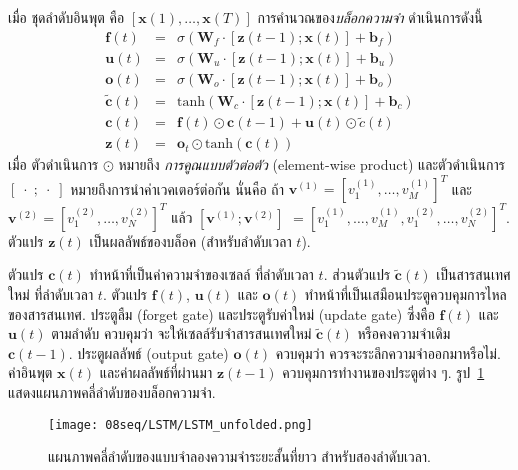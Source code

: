 เมื่อ ชุดลำดับอินพุต คือ $[\bm{x}(1), \ldots, \bm{x}(T)]$
การคำนวณของ\textit{บล็อกความจำ} ดำเนินการดังนี้
\begin{eqnarray}
\bm{f}(t) &=& \sigma(\bm{W}_f \cdot [\bm{z}(t-1); \bm{x}(t)] + \bm{b}_f) 
\label{eq: LSTM forget gate} \\
\bm{u}(t) &=& \sigma(\bm{W}_u \cdot [\bm{z}(t-1); \bm{x}(t)] + \bm{b}_u) 
\label{eq: LSTM input gate} \\
\bm{o}(t) &=& \sigma(\bm{W}_o \cdot [\bm{z}(t-1); \bm{x}(t)] + \bm{b}_o) 
\label{eq: LSTM output gate} \\
\tilde{\bm{c}}(t) &=& \mathrm{tanh}(\bm{W}_c \cdot [\bm{z}(t-1); \bm{x}(t)] + \bm{b}_c) 
\label{eq: LSTM new cell} \\
\bm{c}(t) &=& \bm{f}(t) \odot \bm{c}(t-1) + \bm{u}(t) \odot \tilde{c}(t) 
\label{eq: LSTM update cell} \\
\bm{z}(t) &=& \bm{o}_t \odot \mathrm{tanh}(\bm{c}(t)) 
\label{eq: LSTM cell output} 
\end{eqnarray}
เมื่อ 
ตัวดำเนินการ $\odot$ หมายถึง \textit{การคูณแบบตัวต่อตัว} (element-wise product)
และตัวดำเนินการ $[\;\cdot\; ; \;\cdot\;]$ หมายถึงการนำค่าเวคเตอร์ต่อกัน
นั่นคือ
ถ้า $\bm{v}^{(1)} = [v^{(1)}_1, \ldots, v^{(1)}_M]^T$
และ $\bm{v}^{(2)} = [v^{(2)}_1, \ldots, v^{(2)}_N]^T$
แล้ว
$[\bm{v}^{(1)}; \bm{v}^{(2)}]$
$= [v^{(1)}_1, \ldots, v^{(1)}_M, v^{(2)}_1, \ldots, v^{(2)}_N]^T$.
%
ตัวแปร $\bm{z}(t)$ เป็นผลลัพธ์ของบล็อค (สำหรับลำดับเวลา $t$).

ตัวแปร $\bm{c}(t)$ ทำหน้าที่เป็นค่าความจำของเซลล์ ที่ลำดับเวลา $t$.
ส่วนตัวแปร $\tilde{\bm{c}}(t)$ เป็นสารสนเทศใหม่ ที่ลำดับเวลา $t$.
ตัวแปร $\bm{f}(t)$, $\bm{u}(t)$ และ $\bm{o}(t)$
ทำหน้าที่เป็นเสมือนประตูควบคุมการไหลของสารสนเทศ.
ประตูลืม (forget gate) และประตูรับค่าใหม่ (update gate) 
ซึ่งคือ $\bm{f}(t)$ และ $\bm{u}(t)$ ตามลำดับ
ควบคุมว่า จะให้เซลล์รับจำสารสนเทศใหม่ $\tilde{\bm{c}}(t)$
หรือคงความจำเดิม $\bm{c}(t-1)$.
ประตูผลลัพธ์ (output gate) $\bm{o}(t)$
ควบคุมว่า ควรจะระลึกความจำออกมาหรือไม่.
ค่าอินพุต $\bm{x}(t)$ และค่าผลลัพธ์ที่ผ่านมา $\bm{z}(t-1)$ ควบคุมการทำงานของประตูต่าง ๆ.
รูป~\ref{fig: lstm unfolding diagram}
แสดงแผนภาพคลี่ลำดับของบล็อกความจำ.

\begin{figure}
	\begin{center}		
		\texttt{[image: 08seq/LSTM/LSTM\_unfolded.png]}	
		\caption[แผนภาพคลี่ลำดับของแบบจำลองความจำระยะสั้นที่ยาว]{แผนภาพคลี่ลำดับของแบบจำลองความจำระยะสั้นที่ยาว สำหรับสองลำดับเวลา.
		}
		\label{fig: lstm unfolding diagram}
	\end{center}
\end{figure}
%

